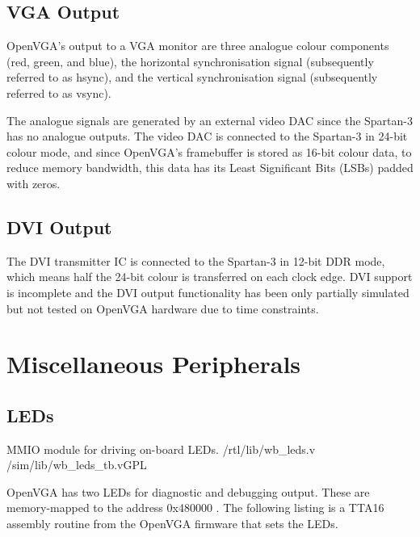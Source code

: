 \subsection{VGA Output}
\label{VIDEO_VGA_Output}

OpenVGA's output to a VGA monitor are three analogue colour components (red,
green, and blue), the horizontal synchronisation signal (subsequently referred to
as hsync), and the vertical synchronisation signal (subsequently referred to as
vsync).

The analogue signals are generated by an external video DAC since the Spartan-3
has no analogue outputs. The video DAC is connected to the Spartan-3 in 24-bit
colour mode, and since OpenVGA's framebuffer is stored as 16-bit colour data, to
reduce memory bandwidth, this data has its Least Significant
Bits (LSBs) padded with
zeros.


\subsection{DVI Output}
\label{VIDEO_DVI_Output}

The DVI transmitter IC is connected to the Spartan-3 in 12-bit DDR mode, which
means half the 24-bit colour is transferred on each clock edge. DVI support is
incomplete and the DVI output functionality has been only partially simulated but
not tested on OpenVGA hardware due to time constraints.


\section{Miscellaneous Peripherals}

\subsection{LEDs}
\label{LED_Driver}

{MMIO module for driving on-board LEDs.} {/rtl/lib/wb\_leds.v}
{/sim/lib/wb\_leds\_tb.v}{GPL}

OpenVGA has two LEDs for diagnostic and debugging output. These are memory-mapped
to the address 0x480000 . The following listing is a TTA16 assembly routine from
the OpenVGA firmware that sets the LEDs.

\begin{center}
\begin{minipage}{0.8\linewidth}
\footnotesize

\normalsize
\end{minipage}
\end{center}

